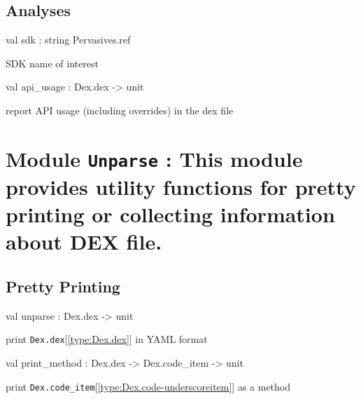 \documentclass[11pt]{article}
\begin{document}
\subsection{Analyses}




\label{val:Android.sdk}\begin{ocamldoccode}
val sdk : string Pervasives.ref
\end{ocamldoccode}
\begin{ocamldocdescription}
SDK name of interest


\end{ocamldocdescription}




\label{val:Android.api-underscoreusage}\begin{ocamldoccode}
val api_usage : Dex.dex -> unit
\end{ocamldoccode}
\begin{ocamldocdescription}
report API usage (including overrides) in the dex file


\end{ocamldocdescription}


\section{Module {\tt{Unparse}} : This module provides utility functions for pretty printing
 or collecting information about DEX file.}
\label{module:Unparse}




\ocamldocvspace{0.5cm}



\subsection{Pretty Printing}




\label{val:Unparse.unparse}\begin{ocamldoccode}
val unparse : Dex.dex -> unit
\end{ocamldoccode}
\begin{ocamldocdescription}
print {\tt{Dex.dex}}[\ref{type:Dex.dex}] in YAML format


\end{ocamldocdescription}




\label{val:Unparse.print-underscoremethod}\begin{ocamldoccode}
val print_method : Dex.dex -> Dex.code_item -> unit
\end{ocamldoccode}
\begin{ocamldocdescription}
print {\tt{Dex.code\_item}}[\ref{type:Dex.code-underscoreitem}] as a method


\end{ocamldocdescription}
\end{document}
